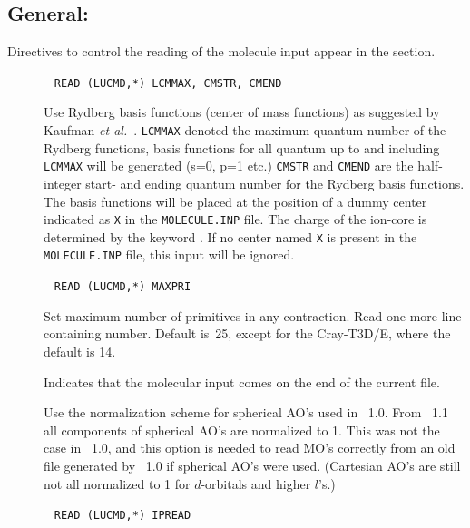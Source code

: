 \subsection{General: }\label{sec:herrdn}

Directives to control the reading of the molecule input appear in the
 section.
\begin{description}
\item[]\verb| |\newline
\verb|READ (LUCMD,*) LCMMAX, CMSTR, CMEND|

Use Rydberg basis functions
 (center of mass functions) as suggested by
Kaufman {\it et al.\/}~\cite{kkwbmjjpbamop22}. \verb|LCMMAX| denoted
the maximum quantum number of the Rydberg functions, basis functions
for all quantum up to and including \verb|LCMMAX| will be generated
(s=0, p=1 etc.) \verb|CMSTR| and \verb|CMEND| are the half-integer
start- and ending quantum number for the Rydberg basis functions. The
basis functions will be placed at the position of a dummy center
indicated as \verb|X| in the \verb|MOLECULE.INP| file. The charge of
the ion-core is determined by the keyword . If no center
named \verb|X| is present in the \verb|MOLECULE.INP| file, this input
will be ignored.

\item[]\verb| |\newline
\verb|READ (LUCMD,*) MAXPRI|

Set maximum number of primitives in any
contraction.  Read one more line containing number.  Default
is~25, except for the Cray-T3D/E, where the default is 14.

\item[] Indicates that the molecular input comes on the
end of the current file. 

\item[] Use the normalization scheme for spherical AO's used in \siraba\ 1.0.
From \siraba\ 1.1 all components of spherical AO's are normalized to 1.
This was not the case in \siraba\ 1.0, and this option is needed to read 
MO's correctly from an old file generated by \siraba\ 1.0 if spherical AO's were used.
(Cartesian AO's are still not all normalized to 1 for $d$-orbitals and higher $l$'s.)

\item[]\verb| |\newline
\verb|READ (LUCMD,*) IPREAD|


\end{description}
